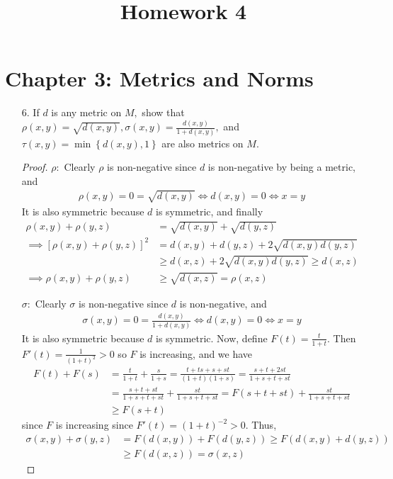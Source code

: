 \documentclass{article}
\begin{document}
\title{Homework 4}
\maketitle
\thispagestyle{fancy}

\section*{Chapter 3: Metrics and Norms}

\begin{itemize}
	\item[6.] If $d$ is any metric on $M,$ show that $\rho(x, y)=\sqrt{d(x, y)}, \sigma(x, y)=\frac{d(x, y)}{1+d(x, y)},$ and $\tau(x, y)=\min\left\{ d(x, y), 1 \right\}$ are also metrics on $M.$
		\begin{proof}
			$\rho:$ Clearly $\rho$ is non-negative since $d$ is non-negative by being a metric, and 
			\begin{align*}
				\rho(x, y)=0=\sqrt{d(x, y)}\iff d(x, y)=0\iff x=y
			\end{align*}
			It is also symmetric because $d$ is symmetric, and finally
			\begin{align*}
				\rho(x, y)+\rho(y, z) &= \sqrt{d(x, y)}+\sqrt{d(y, z)} \\
				\implies \left[ \rho(x, y)+\rho(y, z) \right]^2 &= d(x, y) + d(y, z) + 2\sqrt{d(x, y)d(y, z)} \\
				&\ge d(x, z) + 2\sqrt{d(x, y)d(y, z)} \ge d(x, z) \\
				\implies \rho(x, y)+\rho(y, z)&\ge \sqrt{d(x, z)} = \rho(x, z)
			\end{align*}

			$\sigma:$ Clearly $\sigma$ is non-negative since $d$ is non-negative, and
			\begin{align*}
				\sigma(x, y) = 0 = \frac{d(x, y)}{1+d(x, y)} \iff d(x, y) = 0 \iff x = y
			\end{align*}
			It is also symmetric because $d$ is symmetric. Now, define $F(t)=\frac{t}{1+t}.$ Then $F'(t)=\frac{1}{(1+t)^2}>0$ so $F$ is increasing, and we have
			\begin{align*}
				F(t)+F(s) &= \frac{t}{1+t} + \frac{s}{1+s} = \frac{t+ts+s+st}{(1+t)(1+s)} = \frac{s+t+2st}{1+s+t+st} \\
				&= \frac{s+t+st}{1+s+t+st} + \frac{st}{1+s+t+st} = F(s+t+st) + \frac{st}{1+s+t+st} \\
				&\ge F(s+t)
			\end{align*}
			since $F$ is increasing since $F'(t)=(1+t)^{-2}>0.$ Thus,
			\begin{align*}
				\sigma(x, y)+\sigma(y, z) &= F(d(x, y))+F(d(y, z)) \ge F\left( d(x, y)+d(y, z) \right) \\
				&\ge F(d(x, z)) = \sigma(x, z)
			\end{align*}


\end{proof}
\end{itemize}
\end{document}
